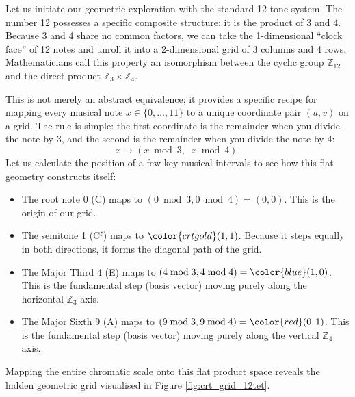 \documentclass[11pt,letterpaper]{amsart}
\newcommand{\Z}{\mathbb{Z}}
\begin{document}
Let us initiate our geometric exploration with the standard 12-tone system. The number 12 possesses a specific composite structure: it is the product of 3 and 4. Because 3 and 4 share no common factors, we can take the 1-dimensional ``clock face'' of 12 notes and unroll it into a 2-dimensional grid of 3 columns and 4 rows. Mathematicians call this property an isomorphism between the cyclic group $\Z_{12}$ and the direct product $\Z_3 \times \Z_4$.

This is not merely an abstract equivalence; it provides a specific recipe for mapping every musical note $x \in \{0, \dots, 11\}$ to a unique coordinate pair $(u, v)$ on a grid. The rule is simple: the first coordinate is the remainder when you divide the note by 3, and the second is the remainder when you divide the note by 4:
\begin{equation}
x \longmapsto (x \bmod 3, \;\; x \bmod 4).
\end{equation}
Let us calculate the position of a few key musical intervals to see how this flat geometry constructs itself:
\begin{itemize}
    \item The root note 0 (C) maps to $(0 \bmod 3, 0 \bmod 4) = (0,0)$. This is the origin of our grid.
    \item The semitone {\color{crtgold}1} ({\color{crtgold}C$^\sharp$}) maps to ${\color{crtgold}(1,1)}$. Because it steps equally in both directions, it forms the diagonal path of the grid.
    \item The Major Third {\color{blue}4} ({\color{blue}E}) maps to $(4 \bmod 3, 4 \bmod 4) = {\color{blue}(1, 0)}$. This is the fundamental step (basis vector) moving purely along the horizontal $\Z_3$ axis.
    \item The Major Sixth {\color{red}9} ({\color{red}A}) maps to $(9 \bmod 3, 9 \bmod 4) = {\color{red}(0, 1)}$. This is the fundamental step (basis vector) moving purely along the vertical $\Z_4$ axis.
\end{itemize}
Mapping the entire chromatic scale onto this flat product space reveals the hidden geometric grid visualised in Figure \ref{fig:crt_grid_12tet}.
\end{document}
